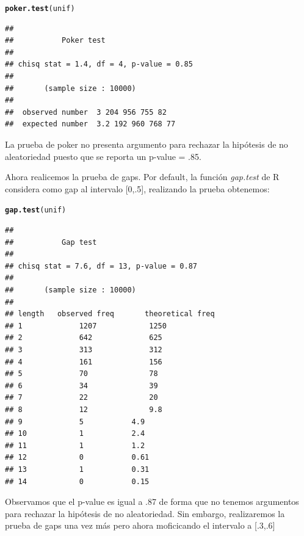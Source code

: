 \documentclass[12 pt]{article}\usepackage[]{graphicx}\usepackage[]{color}
\makeatletter
\newcommand{\hlstd}[1]{\textcolor[rgb]{0.345,0.345,0.345}{#1}}%
\newcommand{\hlkwd}[1]{\textcolor[rgb]{0.737,0.353,0.396}{\textbf{#1}}}%
\newenvironment{kframe}{%
 \def\at@end@of@kframe{}%
 \ifinner\ifhmode%
  \def\at@end@of@kframe{\end{minipage}}%
  \begin{minipage}{\columnwidth}%
 \fi\fi%
 \def\FrameCommand##1{\hskip\@totalleftmargin \hskip-\fboxsep
 \colorbox{shadecolor}{##1}\hskip-\fboxsep
     \hskip-\linewidth \hskip-\@totalleftmargin \hskip\columnwidth}%
 \MakeFramed {\advance\hsize-\width
   \@totalleftmargin\z@ \linewidth\hsize
   \@setminipage}}%
 {\par\unskip\endMakeFramed%
 \at@end@of@kframe}
\newenvironment{knitrout}{}{} %
\makeatother
\begin{document}
\begin{enumerate}
\begin{knitrout}
\begin{kframe}
{\ttfamily\noindent\itshape\color{messagecolor}{\#\# Loading required package: rngWELL}}

{\ttfamily\noindent\itshape{}}\begin{alltt}
\hlkwd{poker.test}\hlstd{(unif)}
\end{alltt}
\begin{verbatim}
## 
## 			 Poker test
## 
## chisq stat = 1.4, df = 4, p-value = 0.85
## 
## 		 (sample size : 10000)
## 
## 	observed number	 3 204 956 755 82 
## 	expected number	 3.2 192 960 768 77
\end{verbatim}
\end{kframe}
\end{knitrout}

La prueba de poker no presenta argumento para rechazar la hipótesis de no aleatoriedad puesto que se reporta un p-value = .85.

Ahora realicemos la prueba de gaps. Por default, la función \textit{gap.test} de R considera como gap al intervalo [0,.5], realizando la prueba obtenemos:

\begin{knitrout}
\color{fgcolor}\begin{kframe}
\begin{alltt}
\hlkwd{gap.test}\hlstd{(unif)}
\end{alltt}
\begin{verbatim}
## 
## 			 Gap test
## 
## chisq stat = 7.6, df = 13, p-value = 0.87
## 
## 		 (sample size : 10000)
## 
## length	observed freq		theoretical freq
## 1 			 1207 			 1250 
## 2 			 642 			 625 
## 3 			 313 			 312 
## 4 			 161 			 156 
## 5 			 70 			 78 
## 6 			 34 			 39 
## 7 			 22 			 20 
## 8 			 12 			 9.8 
## 9 			 5 			 4.9 
## 10 			 1 			 2.4 
## 11 			 1 			 1.2 
## 12 			 0 			 0.61 
## 13 			 1 			 0.31 
## 14 			 0 			 0.15
\end{verbatim}
\end{kframe}
\end{knitrout}

Observamos que el p-value es igual a .87 de forma que no tenemos argumentos para rechazar la hipótesis de no aleatoriedad. Sin embargo, realizaremos la prueba de gaps una vez más pero ahora moficicando el intervalo a [.3,.6]


\end{enumerate}
\end{document}
